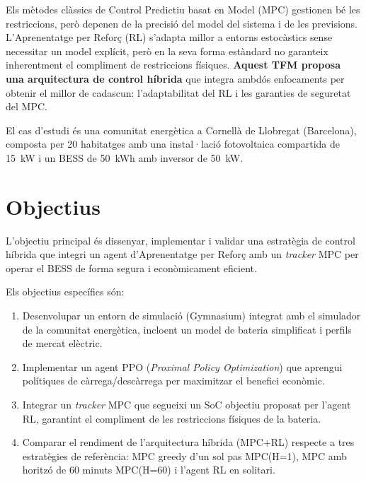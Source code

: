 \documentclass[a4paper,12pt]{ThesisStyle}
\begin{document}
Els mètodes clàssics de Control Predictiu basat en Model (MPC) gestionen bé les restriccions,
però depenen de la precisió del model del sistema i de les previsions. L'Aprenentatge per
Reforç (RL) s'adapta millor a entorns estocàstics sense necessitar un model explícit, però en
la seva forma estàndard no garanteix inherentment el compliment de restriccions físiques.
\textbf{Aquest TFM proposa una arquitectura de control híbrida} que integra ambdós enfocaments per
obtenir el millor de cadascun: l'adaptabilitat del RL i les garanties de seguretat del MPC.

El cas d'estudi és una comunitat energètica a Cornellà de Llobregat (Barcelona), composta per
20 habitatges amb una instal·lació fotovoltaica compartida de 15~kW i un BESS de 50~kWh amb
inversor de 50~kW.

\section*{Objectius}

L'objectiu principal és dissenyar, implementar i validar una estratègia de control híbrida que
integri un agent d'Aprenentatge per Reforç amb un \textit{tracker} MPC per operar el BESS de forma
segura i econòmicament eficient.

Els objectius específics són:
\begin{enumerate}
  \item Desenvolupar un entorn de simulació (Gymnasium) integrat amb el simulador de la
        comunitat energètica, incloent un model de bateria simplificat i perfils de mercat
        elèctric.
  \item Implementar un agent PPO (\textit{Proximal Policy Optimization}) que aprengui
        polítiques de càrrega/descàrrega per maximitzar el benefici econòmic.
  \item Integrar un \textit{tracker} MPC que segueixi un SoC objectiu proposat per l'agent RL,
        garantint el compliment de les restriccions físiques de la bateria.
  \item Comparar el rendiment de l'arquitectura híbrida (MPC+RL) respecte a tres estratègies
        de referència: MPC greedy d'un sol pas MPC(H=1), MPC amb horitzó de 60 minuts
        MPC(H=60) i l'agent RL en solitari.
\end{enumerate}

\end{document}
